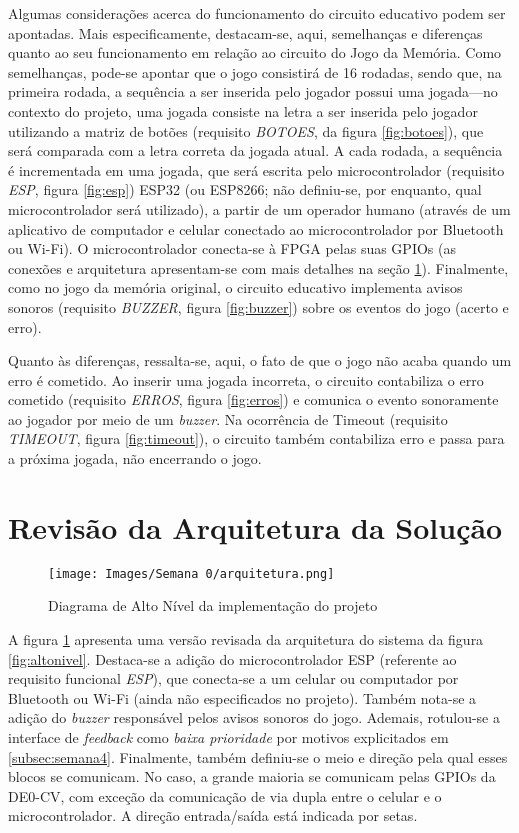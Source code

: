 \documentclass[amsmath,amssymb,floatfix]{report}
\begin{document}
Algumas considerações acerca do funcionamento do circuito educativo podem ser apontadas. Mais especificamente, destacam-se, aqui, semelhanças e diferenças quanto ao seu funcionamento em relação ao circuito do Jogo da Memória. Como semelhanças, pode-se apontar que o jogo consistirá de 16 rodadas, sendo que, na primeira rodada, a sequência a ser inserida pelo jogador possui uma jogada---no contexto do projeto, uma jogada consiste na letra a ser inserida pelo jogador utilizando a matriz de botões (requisito \textit{BOTOES}, da figura \ref{fig:botoes}), que será comparada com a letra correta da jogada atual. A cada rodada, a sequência é incrementada em uma jogada, que será escrita pelo microcontrolador (requisito \textit{ESP}, figura \ref{fig:esp}) ESP32 (ou ESP8266; não definiu-se, por enquanto, qual microcontrolador será utilizado), a partir de um operador humano (através de um aplicativo de computador e celular conectado ao microcontrolador por Bluetooth ou Wi-Fi). O microcontrolador conecta-se à FPGA pelas suas GPIOs (as conexões e arquitetura apresentam-se com mais detalhes na seção \ref{sec:revisaoArquitetura}). Finalmente, como no jogo da memória original, o circuito educativo implementa avisos sonoros (requisito \textit{BUZZER}, figura \ref{fig:buzzer}) sobre os eventos do jogo (acerto e erro).

Quanto às diferenças, ressalta-se, aqui, o fato de que o jogo não acaba quando um erro é cometido. Ao inserir uma jogada incorreta, o circuito contabiliza o erro cometido (requisito \textit{ERROS}, figura \ref{fig:erros}) e comunica o evento sonoramente ao jogador por meio de um \textit{buzzer}. Na ocorrência de Timeout (requisito \textit{TIMEOUT}, figura \ref{fig:timeout}), o circuito também contabiliza erro e passa para a próxima jogada, não encerrando o jogo.

\section{Revisão da Arquitetura da Solução}
\label{sec:revisaoArquitetura}

\begin{figure}[H]
\centering
\texttt{[image: Images/Semana 0/arquitetura.png]} 
    \caption{Diagrama de Alto Nível da implementação do projeto}
    \label{fig:arquitetura}
\end{figure}

A figura \ref{fig:arquitetura} apresenta uma versão revisada da arquitetura do sistema da figura \ref{fig:altonivel}. Destaca-se a adição do microcontrolador ESP (referente ao requisito funcional \textit{ESP}), que conecta-se a um celular ou computador por Bluetooth ou Wi-Fi (ainda não especificados no projeto). Também nota-se a adição do \textit{buzzer} responsável pelos avisos sonoros do jogo. Ademais, rotulou-se a interface de \textit{feedback} como \textit{baixa prioridade} por motivos explicitados em \ref{subsec:semana4}. Finalmente, também definiu-se o meio e direção pela qual esses blocos se comunicam. No caso, a grande maioria se comunicam pelas GPIOs da DE0-CV, com exceção da comunicação de via dupla entre o celular e o microcontrolador. A direção entrada/saída está indicada por setas. 
\end{document}
